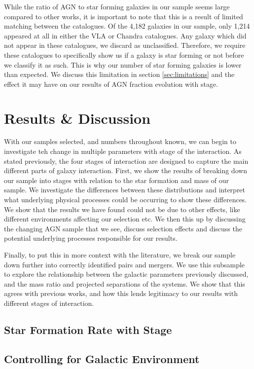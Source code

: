 \documentclass[fleqn,usenatbib]{mnras}
\begin{document}
While the ratio of AGN to star forming galaxies in our sample seems large compared to other works, it is important to note that this is a result of limited matching between the catalogues. Of the 4,182 galaxies in our sample, only 1,214 appeared at all in either the VLA or Chandra catalogues. Any galaxy which did not appear in these catalogues, we discard as unclassified. Therefore, we require these catalogues to specifically show us if a galaxy is star forming or not before we classify it as such. This is why our number of star forming galaxies is lower than expected. We discuss this limitation in section \ref{sec:limitations} and the effect it may have on our results of AGN fraction evolution with stage.

\section{Results \& Discussion}\label{results}
\noindent With our samples selected, and numbers throughout known, we can begin to investigate teh change in multiple parameters with stage of the interaction. As stated previously, the four stages of interaction are designed to capture the main different parts of galaxy interaction. First, we show the results of breaking down our sample into stages with relation to the star formation and mass of our sample. We investigate the differences between these distributions and interpret what underlying physical processes could be occurring to show these differences. We show that the results we have found could not be due to other effects, like different environments affecting our selection etc. We then this up by discussing the changing AGN sample that we see, discuss selection effects and discuss the potential underlying processes responsible for our results.

Finally, to put this in more context with the literature, we break our sample down further into correctly identified pairs and mergers. We use this subsample to explore the relationship between the galactic parameters previously discussed, and the mass ratio and projected separations of the systems. We show that this agrees with previous works, and how this lends legitimacy to our results with different stages of interaction.

\subsection{Star Formation Rate with Stage}

\subsection{Controlling for Galactic Environment}
\end{document}
